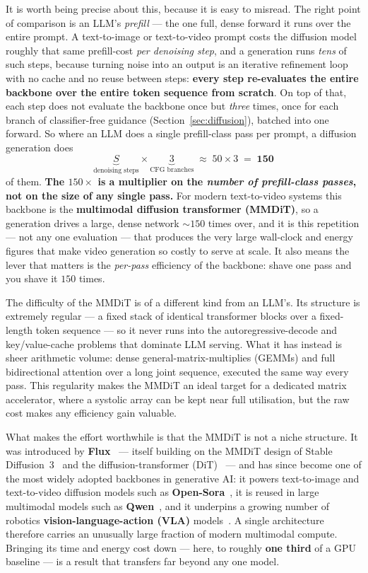 \documentclass[11pt]{report}
\begin{document}
It is worth being precise about this, because it is easy to misread. The
right point of comparison is an LLM's \emph{prefill} --- the one full,
dense forward it runs over the entire prompt. A text-to-image or
text-to-video prompt costs the diffusion model roughly that same prefill-cost
\emph{per denoising step}, and a generation runs \emph{tens} of such steps,
because turning noise into an output is an iterative refinement loop with no
cache and no reuse between steps: \textbf{every step re-evaluates the entire
backbone over the entire token sequence from scratch}. On top of that, each
step does not evaluate the backbone once but \emph{three} times, once for
each branch of classifier-free guidance (Section~\ref{sec:diffusion}),
batched into one forward. So where an LLM does a single prefill-class pass
per prompt, a diffusion generation does
\[
\underbrace{S}_{\text{denoising steps}} \times
\underbrace{3}_{\text{CFG branches}}
\;\approx\; 50 \times 3 \;=\; \mathbf{150}
\]
of them. \textbf{The $150\times$ is a multiplier on the \emph{number of
prefill-class passes}, not on the size of any single pass.} For modern
text-to-video systems this backbone is the \textbf{multimodal diffusion
transformer (MMDiT)}, so a generation drives a large, dense network
${\sim}150$ times over, and it is this repetition --- not any one evaluation
--- that produces the very large wall-clock and energy figures that make
video generation so costly to serve at scale. It also means the lever that
matters is the \emph{per-pass} efficiency of the backbone: shave one pass and
you shave it $150$ times.

The difficulty of the MMDiT is of a different kind from an LLM's. Its
structure is extremely regular --- a fixed stack of identical transformer
blocks over a fixed-length token sequence --- so it never runs into the
autoregressive-decode and key/value-cache problems that dominate LLM
serving. What it has instead is sheer arithmetic volume: dense
general-matrix-multiplies (GEMMs) and full bidirectional attention over a
long joint sequence, executed the same way every pass. This regularity
makes the MMDiT an ideal target for a dedicated matrix accelerator, where
a systolic array can be kept near full utilisation, but the raw cost
makes any efficiency gain valuable.

What makes the effort worthwhile is that the MMDiT is not a niche
structure. It was introduced by \textbf{Flux}~\cite{bfl2024flux} ---
itself building on the MMDiT design of Stable Diffusion~3~\cite{esser2024sd3}
and the diffusion-transformer (DiT)~\cite{peebles2023dit} --- and has since
become one of the most widely adopted backbones in generative AI: it powers
text-to-image and text-to-video diffusion models such as
\textbf{Open-Sora}~\cite{opensora2024}, it is reused in large multimodal
models such as \textbf{Qwen}~\cite{qwenimage2025}, and it underpins a growing
number of robotics \textbf{vision-language-action (VLA)}
models~\cite{openvla2024}. A single architecture
therefore carries an unusually large fraction of modern multimodal
compute. Bringing its time and energy cost down --- here, to roughly
\textbf{one third} of a GPU baseline --- is a result that transfers far
beyond any one model.
\end{document}
